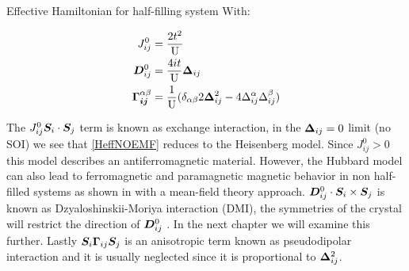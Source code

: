 \begin{section}{Effective Hamiltonian for half-filling system}
With:

\begin{align}
J_{ij}^0 &= \frac{2t^2}{\text{U}} \label{Jij0} \\
\boldsymbol{D}_{ij}^0 &= \frac{4it}{\text{U}}\boldsymbol{\Delta}_{ij} \label{Dij0} \\ 
\boldsymbol{\Gamma_{ij}}^{\alpha \beta} &= \frac{1}{\text{U}}(\delta_{\alpha \beta} 2\boldsymbol{\Delta}_{ij}^2 - 4\Delta_{ij}^\alpha\Delta_{ij}^\beta) \label{Gij0}
\end{align}

The $J_{ij}^0\boldsymbol{S}_i\cdot\boldsymbol{S}_j$ term is known as exchange interaction, in the $\boldsymbol{\Delta}_{ij} = 0$ limit (no SOI) we see that \ref{HeffNOEMF} reduces to the Heisenberg model. Since $J_{ij}^0 > 0$ this model describes an antiferromagnetic material. However, the Hubbard model can also lead to ferromagnetic and paramagnetic magnetic behavior in non half-filled systems as shown in \cite{Hirsch1985} with a mean-field theory approach. $\boldsymbol{D}_{ij}^0 \cdot\boldsymbol{S}_i \times \boldsymbol{S}_j$ is known as Dzyaloshinskii-Moriya
interaction (DMI), the symmetries of the crystal will restrict the direction of $\boldsymbol{D}_{ij}^0$ \cite{Moriya1960}. In the next chapter we will examine this further. Lastly $\boldsymbol{S}_i \boldsymbol{\Gamma}_{ij} \boldsymbol{S}_j$ is an anisotropic term known as pseudodipolar interaction \citep{Moriya1960} and it is usually neglected since it is proportional to $\boldsymbol{\Delta}_{ij}^2$.

\end{section}

